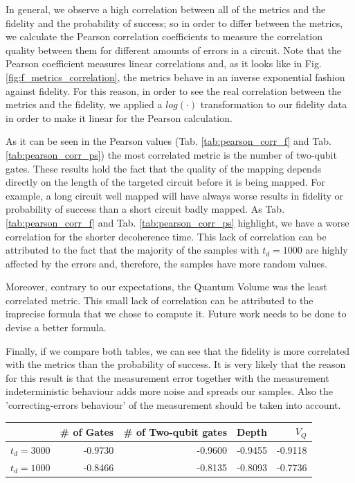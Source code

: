 In general, we observe a high correlation between all of the metrics and the fidelity and the probability of success; so in order to differ between the metrics, we calculate the Pearson correlation coefficients to measure the correlation quality between them for different amounts of errors in a circuit.
Note that the Pearson coefficient measures linear correlations and, as it looks like in Fig. \ref{fig:f_metrics_correlation}, the metrics behave in an inverse exponential fashion against fidelity.
For this reason, in order to see the real correlation between the metrics and the fidelity, we applied a \(log(\cdot)\) transformation to our fidelity data in order to make it linear for the Pearson calculation.


As it can be seen in the Pearson values (Tab. \ref{tab:pearson_corr_f} and Tab. \ref{tab:pearson_corr_ps}) the most correlated metric is the number of two-qubit gates.
These results hold the fact that the quality of the mapping depends directly on the length of the targeted circuit before it is being mapped.
For example, a long circuit well mapped will have always worse results in fidelity or probability of success than a short circuit badly mapped.
As Tab. \ref{tab:pearson_corr_f} and Tab. \ref{tab:pearson_corr_ps} highlight, we have a worse correlation for the shorter decoherence time.
This lack of correlation can be attributed to the fact that the majority of the samples with \(t_d = 1000\) are highly affected by the errors and, therefore, the samples have more random values.

Moreover, contrary to our expectations, the Quantum Volume was the least correlated metric.
This small lack of correlation can be attributed to the imprecise formula that we chose to compute it.
Future work needs to be done to devise a better formula.

Finally, if we compare both tables, we can see that the fidelity is more correlated with the metrics than the probability of success.
It is very likely that the reason for this result is that the measurement error together with the measurement indeterministic behaviour  adds more noise and spreads our samples.
Also the 'correcting-errors behaviour' of the measurement should be taken into account.

\begin{center}
\begin{tabular}{lrrrr}
\hline
 & \# of Gates & \# of Two-qubit gates & Depth & \(V_Q\)\\
\hline
\(t_d = 3000\) & -0.9730 & -0.9600 & -0.9455 & -0.9118\\
\(t_d = 1000\) & -0.8466 & -0.8135 & -0.8093 & -0.7736\\
\hline
\end{tabular}
\end{center}


